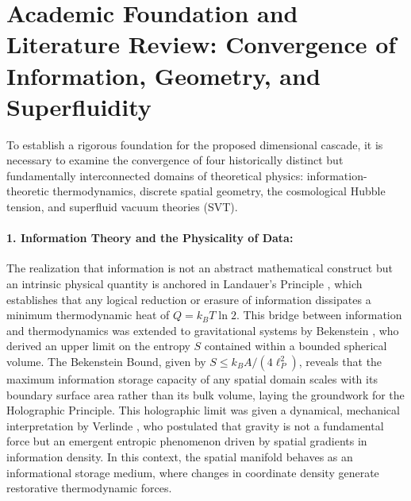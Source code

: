 \documentclass[11pt,a4paper]{article}
\theoremstyle{plain}
\theoremstyle{definition}
\theoremstyle{remark}
\begin{document}
\newpage
\section{Academic Foundation and Literature Review: Convergence of Information, Geometry, and Superfluidity}
To establish a rigorous foundation for the proposed dimensional cascade, it is necessary to examine the convergence of four historically distinct but fundamentally interconnected domains of theoretical physics: information-theoretic thermodynamics, discrete spatial geometry, the cosmological Hubble tension, and superfluid vacuum theories (SVT). 

\paragraph{1. Information Theory and the Physicality of Data:}
The realization that information is not an abstract mathematical construct but an intrinsic physical quantity is anchored in Landauer's Principle \cite{landauer1961}, which establishes that any logical reduction or erasure of information dissipates a minimum thermodynamic heat of $Q = k_B T \ln 2$. This bridge between information and thermodynamics was extended to gravitational systems by Bekenstein \cite{bekenstein1981}, who derived an upper limit on the entropy $S$ contained within a bounded spherical volume. The Bekenstein Bound, given by $S \le k_B A / (4 \ell_P^2)$, reveals that the maximum information storage capacity of any spatial domain scales with its boundary surface area rather than its bulk volume, laying the groundwork for the Holographic Principle. This holographic limit was given a dynamical, mechanical interpretation by Verlinde \cite{verlinde2011}, who postulated that gravity is not a fundamental force but an emergent entropic phenomenon driven by spatial gradients in information density. In this context, the spatial manifold behaves as an informational storage medium, where changes in coordinate density generate restorative thermodynamic forces.
\end{document}
